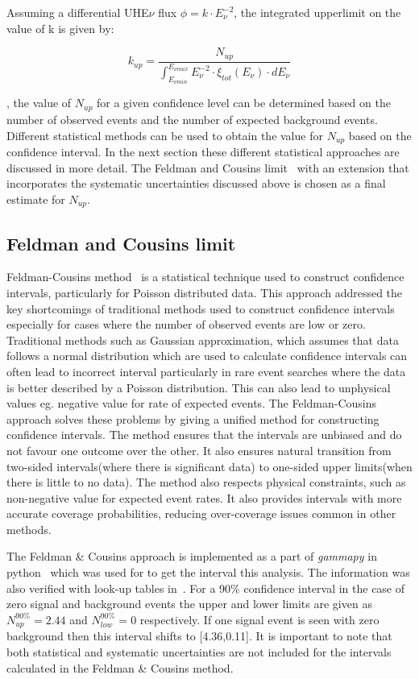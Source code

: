 Assuming a differential UHE$\nu$ flux $\phi = k \cdot E_{\nu}^{-2}$, the integrated upperlimit on the value of k is given by:

\begin{equation}
  k_{up} = \frac{N_{up}}{\int_{E_{\nu min}}^{E_{\nu max}} E_{\nu}^{-2} \cdot \xi_{tot}(E_{\nu}) \cdot dE_{\nu}}
\end{equation}

, the value of $N_{up}$ for a given confidence level can be determined based on the number of observed events and the number of expected background events. Different statistical methods can be used to obtain the value for $N_{up}$ based on the confidence interval. In the next section these different statistical approaches are discussed in more detail. The Feldman and Cousins limit~\cite{} with an extension that incorporates the systematic uncertainties discussed above is chosen as a final estimate for $N_{up}$.

\subsection{Feldman and Cousins limit}
\label{subsec:FandC}
Feldman-Cousins method~\cite{} is a statistical technique used to construct confidence intervals, particularly for Poisson distributed data. This approach addressed the key shortcomings of traditional methods used to construct confidence intervals especially for cases where the number of observed events are low or zero. Traditional methods such as Gaussian approximation, which assumes that data follows a normal distribution which are used to calculate confidence intervals can often lead to incorrect interval particularly in rare event searches where the data is better described by a Poisson distribution. This can also lead to unphysical values eg. negative value for rate of expected events. The Feldman-Cousins approach solves these problems by giving a unified method for constructing confidence intervals. The method ensures that the intervals are unbiased and do not favour one outcome over the other. It also ensures natural transition from two-sided intervals(where there is significant data) to one-sided upper limits(when there is little to no data). The method also respects physical constraints, such as non-negative value for expected event rates. It also provides intervals with more accurate coverage probabilities, reducing over-coverage issues common in other methods. 

The Feldman \& Cousins approach is implemented as a part of \textit{gammapy} in python~\cite{} which was used for to get the interval this analysis. The information was also verified with look-up tables in~\cite{}. For a 90\% confidence interval in the case of zero signal and background events the upper and lower limits are given as $N^{90\%}_{up} = 2.44$ and $N^{90\%}_{low} = 0$ respectively. If one signal event is seen with zero background then this interval shifts to [4.36,0.11]. It is important to note that both statistical and systematic uncertainties are not included for the intervals calculated in the Feldman \& Cousins method. 

